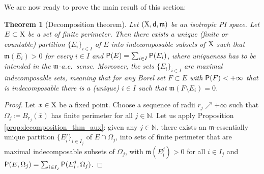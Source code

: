 \documentclass[reqno]{amsart}
\numberwithin{equation}{section}
\newcommand{\N}{\mathbb{N}}
\newcommand{\X}{{\rm X}}
\newcommand{\sfd}{{\sf d}}
\newcommand{\mm}{\mathfrak m}
\newcommand{\1}{\mathbbm 1}
\renewcommand{\P}{{\sf P}}
\newtheorem{theorem}{Theorem}[section]
\begin{document}
%
%
We are now ready to prove the main result of this section:
%
%
\begin{theorem}[Decomposition theorem]\label{thm:decomposition_thm}
Let \((\X,\sfd,\mm)\) be an isotropic PI space. Let \(E\subset\X\) be a set
of finite perimeter. Then there exists a unique (finite or countable) partition
\(\{E_i\}_{i\in I}\) of \(E\) into indecomposable subsets of \(\X\) such
that \(\mm(E_i)>0\) for every \(i\in I\) and \(\P(E)=\sum_{i\in I}\P(E_i)\),
where uniqueness has to be intended in the \(\mm\)-a.e.\ sense. Moreover,
the sets \(\{E_i\}_{i\in I}\) are maximal indecomposable sets, meaning that
for any Borel set \(F\subset E\) with \(\P(F)<+\infty\) that is indecomposable
there is a (unique) \(i\in I\) such that \(\mm(F\setminus E_i)=0\).
\end{theorem}
\begin{proof}
Let \(\bar x\in\X\) be a fixed point. Choose a sequence of radii \(r_j\nearrow +\infty\)
such that \(\Omega_j\coloneqq B_{r_j}(\bar x)\) has finite perimeter for all \(j\in\N\).
Let us apply Proposition \ref{prop:decomposition_thm_aux}: given any \(j\in\N\),
there exists an \(\mm\)-essentially unique partition \(\{E^j_i\}_{i\in I_j}\)
of \(E\cap\Omega_j\), into sets of finite perimeter that are maximal indecomposable
subsets of \(\Omega_j\), with \(\mm(E^j_i)>0\) for all \(i\in I_j\) and
\(\P(E,\Omega_j)=\sum_{i\in I_j}\P(E^j_i,\Omega_j)\).


\end{proof}
\end{document}

